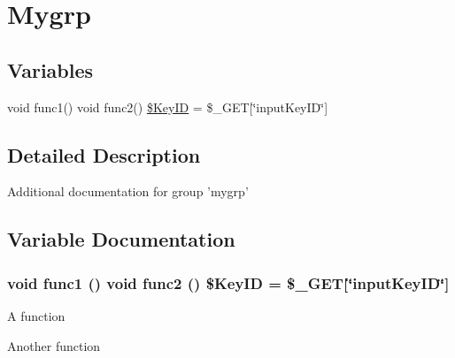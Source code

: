 \hypertarget{group__mygrp}{\section{Mygrp}
\label{group__mygrp}
}
\subsection*{Variables}
\begin{DoxyCompactItemize}
\item 
void func1() void func2() \hyperlink{group__mygrp_ga57dd44bde6acd18197859f6314612ae8}{\$\+Key\+I\+D} = \$\+\_\+\+G\+E\+T\mbox{[}\char`\"{}input\+Key\+I\+D\char`\"{}\mbox{]}
\end{DoxyCompactItemize}


\subsection{Detailed Description}
Additional documentation for group 'mygrp' 

\subsection{Variable Documentation}
\hypertarget{group__mygrp_ga57dd44bde6acd18197859f6314612ae8}{
\subsubsection[{\$\+Key\+I\+D}]{\setlength{\rightskip}{0pt plus 5cm}void func1 () void func2 () \$Key\+I\+D = \$\+\_\+\+G\+E\+T\mbox{[}\char`\"{}input\+Key\+I\+D\char`\"{}\mbox{]}}}\label{group__mygrp_ga57dd44bde6acd18197859f6314612ae8}
A function

Another function 